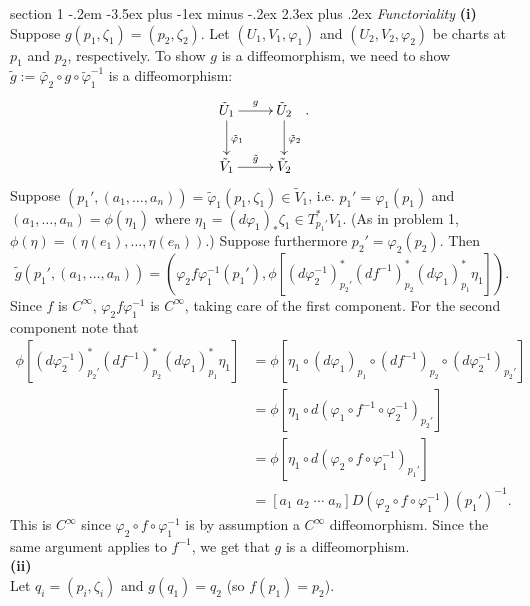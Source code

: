 \documentclass[12pt]{article}
\makeatletter
\theoremstyle{norm}
\newcommand{\ph}[0]{\varphi}
\newcommand{\subprob}[1]{\noindent\textbf{#1}\\}
\newcommand{\iy}[0]{\infty}
\newenvironment{problem}{\@startsection
       {section}
       {1}
       {-.2em}
       {-3.5ex plus -1ex minus -.2ex}
       {2.3ex plus .2ex}
       {\pagebreak[3]%
       \large\bf\noindent{Problem }
       }
       }
       {%
       }
\makeatother
\begin{document}
\begin{problem}{\it Functoriality}
\subprob{(i)}
Suppose $g(p_1,\zeta_1)=(p_2,\zeta_2)$. Let $(U_1,V_1,\ph_1)$ and $(U_2,V_2,\ph_2)$ be charts at $p_1$ and $p_2$, respectively. To show $g$ is a diffeomorphism, we need to show $\tilde{g}:=\tilde{\ph_2}\circ g \circ\tilde{\ph}_1^{-1}$ is a diffeomorphism:
\[
\xymatrix{
\tilde{U}_1\ar[r]^{g}\ar[d]^{\tilde{\ph}_1}& \tilde{U}_2\ar[d]^{\tilde{\ph}_2}\\
\tilde{V}_1\ar[r]^{\tilde g}&\tilde V_2
}.
\]
Suppose $(p_1',(a_1,\ldots, a_n))=\tilde{\ph}_1(p_1,\zeta_1)\in \tilde V_1$, i.e. $p_1'=\ph_1(p_1)$ and $(a_1,\ldots, a_n)=\phi(\eta_1)$ where $\eta_1=(d\ph_1)_*\zeta_1\in T^*_{p_1'}V_1$. (As in problem 1, $\phi(\eta)=(\eta(e_1),\ldots, \eta(e_n))$.) Suppose furthermore $p_2'=\ph_2(p_2)$.  Then
\[
\tilde{g}(p_1',(a_1,\ldots, a_n))= (\ph_2f\ph_1^{-1}(p_1'), \phi[(d\ph_2^{-1})_{p_2'}^*(df^{-1})_{p_2}^*(d\ph_1)_{p_1}^*\eta_1]).
\]
Since $f$ is $C^{\iy}$, $\ph_2f\ph_1^{-1}$ is $C^{\iy}$, taking care of the first component. For the second component note that
\begin{align*}
\phi[(d\ph_2^{-1})_{p_2'}^*(df^{-1})_{p_2}^*(d\ph_1)_{p_1}^*\eta_1]
&=\phi[\eta_1\circ (d\ph_1)_{p_1}\circ (df^{-1})_{p_2}\circ (d\ph_2^{-1})_{p_2'}]\\
&=\phi[\eta_1\circ d(\ph_1\circ f^{-1}\circ \ph_2^{-1})_{p_2'}]\\
&=\phi[\eta_1\circ d(\ph_2\circ f\circ \ph_1^{-1})_{p_1'}]\\
&=[a_1\;a_2\;\cdots \;a_n]D(\ph_2\circ f\circ \ph_1^{-1})(p_1')^{-1}.
\end{align*}
This is $C^{\iy}$ since $\ph_2\circ f\circ \ph_1^{-1}$ is by assumption a  $C^{\iy}$ diffeomorphism. Since the same argument applies to $f^{-1}$, we get that $g$ is a diffeomorphism.\\

\subprob{(ii)}
Let $q_i=(p_i,\zeta_i)$ and $g(q_1)=q_2$ (so $f(p_1)=p_2$).


\end{problem}
\end{document}
